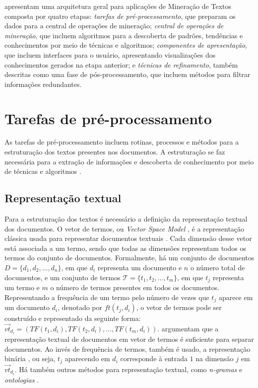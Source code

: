 \documentclass[
    12pt,                %
    oneside,            %
    a4paper,            %
    english,            %
    brazil                %
    ]{abntex2ppgsi}
\begin{document}

 apresentam uma arquitetura geral para aplicações de Mineração de Textos composta por quatro etapas: \textit{tarefas de pré-processamento}, que preparam os dados para a central de operações de mineração; \textit{central de operações de mineração}, que incluem algoritmos para a descoberta de padrões, tendências e conhecimentos por meio de técnicas e algoritmos; \textit{componentes de apresentação}, que incluem interfaces para o usuário, apresentando visualizações dos conhecimentos gerados na etapa anterior; e \textit{técnicas de refinamento}, também descritas como uma fase de pós-processamento, que incluem métodos para filtrar informações redundantes.

\section{Tarefas de pré-processamento}
\label{subsec:preprocessamento}

As tarefas de pré-processamento incluem rotinas, processos e métodos para a estruturação dos textos presentes nos documentos.
A estruturação se faz necessária para a extração de informações e descoberta de conhecimento por meio de técnicas e algoritmos \cite{Hotho2005}.

\subsection{Representação textual}

Para a estruturação dos textos é necessário a definição da representação textual dos documentos.
O vetor de termos, ou \textit{Vector Space Model} \cite{Salton1975}, é a representação clássica usada para representar documentos textuais \cite{Sebastiani2002,Lops2011}.
Cada dimensão desse vetor está associada a um termo, sendo que todas as dimensões representam todos os termos do conjunto de documentos.
Formalmente, há um conjunto de documentos $D = \{ d_1, d_2, \dots, d_n \}$, em que $d_i$ representa um documento e $n$ o número total de documentos, e um conjunto de termos $\mathcal{T} = \{ t_1, t_2, \dots, t_m \}$, em que $t_j$ representa um termo e $m$ o número de termos presentes em todos os documentos.
Representando a frequência de um termo pelo número de vezes que $t_j$ aparece em um documento $d_i$, denotado por $ft(t_j, d_i)$, o vetor de termos pode ser construído e representado da seguinte forma: $\vec{vt}_{d_i} = ( TF(t_1, d_i), TF(t_2, d_i), \dots, TF(t_m, d_i) )$.
 argumentam que a representação textual de documentos em vetor de termos é suficiente para separar documentos.
Ao invés de frequência de termos, também é usado, a representação binária \cite{Sebastiani2002}, ou seja, $t_j$ aparecendo em $d_i$ corresponde à entrada $1$ na dimensão $j$ em $\vec{vt}_{d_i}$.
Há também outros métodos para representação textual, como \textit{n-gramas} e \textit{ontologias} \cite{Lops2011}.
\end{document}
